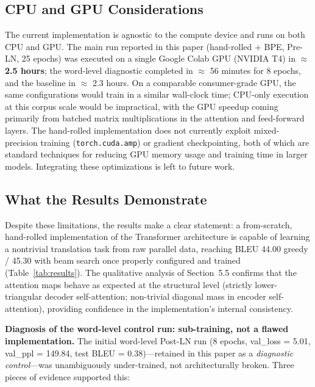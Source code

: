 \subsection{CPU and GPU Considerations}

The current implementation is agnostic to the compute device and runs on both CPU and GPU. The main run reported in this paper (hand-rolled + BPE, Pre-LN, 25 epochs) was executed on a single Google Colab GPU (NVIDIA T4) in \textbf{$\approx$ 2.5 hours}; the word-level diagnostic completed in $\approx$ 56 minutes for 8 epochs, and the baseline in $\approx$ 2.3 hours. On a comparable consumer-grade GPU, the same configurations would train in a similar wall-clock time; CPU-only execution at this corpus scale would be impractical, with the GPU speedup coming primarily from batched matrix multiplications in the attention and feed-forward layers. The hand-rolled implementation does not currently exploit mixed-precision training (\texttt{torch.cuda.amp}) or gradient checkpointing, both of which are standard techniques for reducing GPU memory usage and training time in larger models. Integrating these optimizations is left to future work.

\subsection{What the Results Demonstrate}

Despite these limitations, the results make a clear statement: a from-scratch, hand-rolled implementation of the Transformer architecture is capable of learning a nontrivial translation task from raw parallel data, reaching BLEU 44.00 greedy / 45.30 with beam search once properly configured and trained (Table~\ref{tab:results}). The qualitative analysis of Section~5.5 confirms that the attention maps behave as expected at the structural level (strictly lower-triangular decoder self-attention; non-trivial diagonal mass in encoder self-attention), providing confidence in the implementation's internal consistency.

\textbf{Diagnosis of the word-level control run: sub-training, not a flawed implementation.} The initial word-level Post-LN run (8 epochs, val\_loss = 5.01, val\_ppl = 149.84, test BLEU = 0.38)---retained in this paper as a \textit{diagnostic control}---was unambiguously under-trained, not architecturally broken. Three pieces of evidence supported this:

